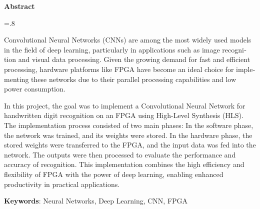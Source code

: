 


\pagestyle{empty}

\begin{latin}

\begin{center}
\textbf{Abstract}
\end{center}
\baselineskip=.8\baselineskip

Convolutional Neural Networks (CNNs) are among the most widely used models in the field of deep learning, particularly in applications such as image recognition and visual data processing. Given the growing demand for fast and efficient processing, hardware platforms like FPGA have become an ideal choice for implementing these networks due to their parallel processing capabilities and low power consumption.

In this project, the goal was to implement a Convolutional Neural Network for handwritten digit recognition on an FPGA using High-Level Synthesis (HLS). The implementation process consisted of two main phases: In the software phase, the network was trained, and its weights were stored. In the hardware phase, the stored weights were transferred to the FPGA, and the input data was fed into the network. The outputs were then processed to evaluate the performance and accuracy of recognition. This implementation combines the high efficiency and flexibility of FPGA with the power of deep learning, enabling enhanced productivity in practical applications.


\bigskip\noindent\textbf{Keywords}:
Neural Networks, Deep Learning, CNN, FPGA

\end{latin}
